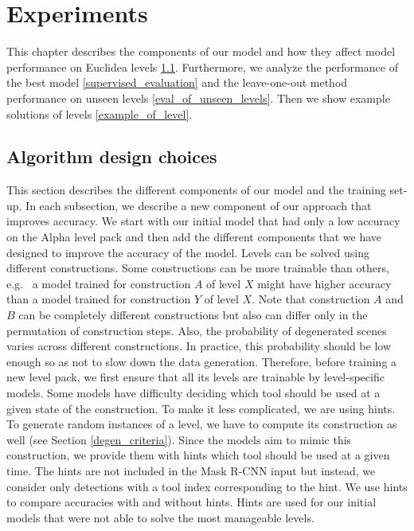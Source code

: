 \chapter{Experiments}
\label{experiment_chapter}
This chapter describes the components of our model and how they affect model performance on Euclidea levels \ref{design_choices}. Furthermore, we analyze the performance of the best model \ref{supervised_evaluation} and the leave-one-out method performance on unseen levels \ref{eval_of_unseen_levels}. Then we show example solutions of levels \ref{example_of_level}.
\section{Algorithm design choices}
\label{design_choices}
This section describes the different components of our model and the training set-up. In each subsection, we describe a new component of our approach that improves accuracy. We start with our initial model that had only a low accuracy on the Alpha level pack and then add the different components that we have designed to improve the accuracy of the model.
\newline \newline
Levels can be solved using different constructions. Some constructions can be more trainable than others, e.g.~ a model trained for construction $A$ of level $X$ might have higher accuracy than a model trained for construction $Y$ of level $X$. Note that construction $A$ and $B$ can be completely different constructions but also can differ only in the permutation of construction steps. Also, the probability of degenerated scenes varies across different constructions. In practice, this probability should be low enough so as not to slow down the data generation. Therefore, before training a new level pack, we first ensure that all its levels are trainable by level-specific models. 
\newline \newline
Some models have difficulty deciding which tool should be used at a given state of the construction. To make it less complicated, we are using hints. To generate random instances of a level, we have to compute its construction as well (see Section \ref{degen_criteria}). Since the models aim to mimic this construction, we provide them with hints which tool should be used at a given time. The hints are not included in the Mask {R-CNN} input but instead, we consider only detections with a tool index corresponding to the hint. We use hints to compare accuracies with and without hints. Hints are used for our initial models that were not able to solve the most manageable levels.

